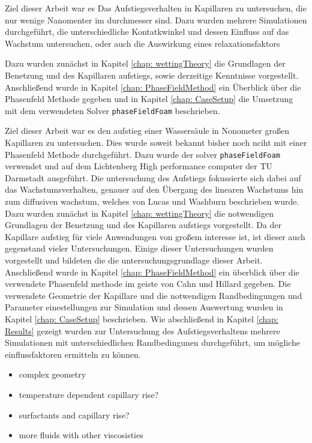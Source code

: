 
Ziel dieser Arbeit war es Das Aufstiegsverhalten in Kapillaren zu untersuchen, die nur wenige Nanomenter im durchmesser sind. Dazu wurden mehrere Simulationen durchgeführt, die unterschiedliche Kontatkwinkel und dessen Einfluss auf das Wachstum untersuchen, oder auch die Auswirkung eines relaxationsfaktors 



Dazu wurden zunächst in Kapitel \ref{chap: wettingTheory} die Grundlagen der Benetzung und des Kapillaren aufstiegs, sowie derzeitige Kenntnisse vorgestellt. Anschließend wurde in Kapitel \ref*{chap: PhaseFieldMethod} ein Überblick über die Phasenfeld Methode gegeben und in Kapitel \ref*{chap: CaseSetup} die Umsetzung mit dem verwendeten Solver \texttt{phaseFieldFoam} beschrieben. 


Ziel dieser Arbeit war es den aufstieg einer Wassersäule in Nonometer großen Kapillaren zu untersuchen. Dies wurde soweit bekannt bisher noch nciht mit einer Phasenfeld Methode durchgeführt. Dazu wurde der solver \texttt{phaseFieldFoam} verwendet und auf dem Lichtenberg High performance computer der TU Darmstadt ausgeführt. Die untersuchung des Aufstiegs fokussierte sich dabei auf das Wachstumsverhalten, genauer auf den Übergang des linearen Wachstums hin zum diffusiven wachstum, welches von Lucas und Washburn beschrieben wurde. Dazu wurden zunächst in Kapitel \ref*{chap: wettingTheory} die notwendigen Grundlagen der Benetzung und des Kapillaren aufstiegs vorgestellt. Da der Kapillare aufstieg für viele Anwendungen von großem interesse ist, ist dieser auch gegenstand vieler Untersuchungen. Einige dieser Untersuchungen wurden vorgestellt und bildeten die die untersuchungsgrundlage dieser Arbeit. Anschließend wurde in Kapitel \ref*{chap: PhaseFieldMethod} ein überblick über die verwendete Phasenfeld methode im geiste von Cahn und Hillard gegeben. Die verwendete Geometrie der Kapillare und die notwendigen Randbedingungen und Parameter einestellungen zur Simulation und dessen Auswertung wurden in Kapitel \ref*{chap: CaseSetup} beschrieben. 
Wie abschließend in Kapitel \ref*{chap: Results} gezeigt wurden zur Untersuchung des Aufstiegsverhaltens mehrere Simulationen mit unterschiedlichen Randbedingunen durchgeführt, um mögliche einflussfaktoren ermitteln zu können. 


\begin{itemize}
    \item complex geometry
    \item temperature dependent capillary rise?
    \item surfactants and capillary rise?
    \item more fluids with other viscosisties
\end{itemize}